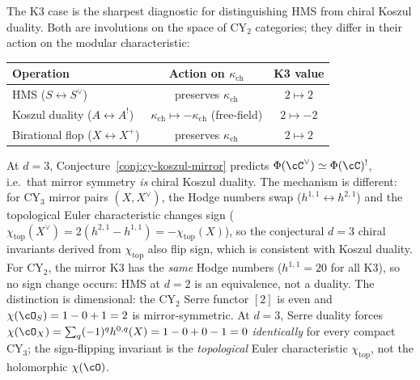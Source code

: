 \begin{remark}[HMS \texorpdfstring{$\neq$}{!=} Koszul: the K3 diagnostic]
\label{rem:hms-neq-koszul-k3}
The K3 case is the sharpest diagnostic for distinguishing HMS from chiral Koszul duality. Both are involutions on the space of CY$_2$ categories; they differ in their action on the modular characteristic:
\begin{center}
\renewcommand{\arraystretch}{1.2}
\begin{tabular}{lcc}
 \toprule
 \textbf{Operation} & \textbf{Action on $\kappa_{\mathrm{ch}}$} & \textbf{K3 value} \\
 \midrule
 HMS ($S \leftrightarrow S^\vee$) & preserves $\kappa_{\mathrm{ch}}$ & $2 \mapsto 2$ \\
 Koszul duality ($A \leftrightarrow A^!$) & $\kappa_{\mathrm{ch}} \mapsto -\kappa_{\mathrm{ch}}$ (free-field) & $2 \mapsto -2$ \\
 Birational flop ($X \leftrightarrow X^+$) & preserves $\kappa_{\mathrm{ch}}$ & $2 \mapsto 2$ \\
 \bottomrule
\end{tabular}
\end{center}
At $d = 3$, Conjecture~\ref{conj:cy-koszul-mirror} predicts $\Phi(\cC^\vee) \simeq \Phi(\cC)^!$, i.e.\ that mirror symmetry \emph{is} chiral Koszul duality. The mechanism is different: for CY$_3$ mirror pairs $(X, X^\vee)$, the Hodge numbers swap ($h^{1,1} \leftrightarrow h^{2,1}$) and the topological Euler characteristic changes sign ($\chi_{\mathrm{top}}(X^\vee) = 2(h^{2,1} - h^{1,1}) = -\chi_{\mathrm{top}}(X)$), so the conjectural $d = 3$ chiral invariants derived from $\chi_{\mathrm{top}}$ also flip sign, which is consistent with Koszul duality. For CY$_2$, the mirror K3 has the \emph{same} Hodge numbers ($h^{1,1} = 20$ for all K3), so no sign change occurs: HMS at $d = 2$ is an equivalence, not a duality. The distinction is dimensional: the CY$_2$ Serre functor $[2]$ is even and $\chi(\cO_S) = 1 - 0 + 1 = 2$ is mirror-symmetric. At $d = 3$, Serre duality forces $\chi(\cO_X) = \sum_q (-1)^q h^{0,q}(X) = 1 - 0 + 0 - 1 = 0$ \emph{identically} for every compact CY$_3$; the sign-flipping invariant is the \emph{topological} Euler characteristic $\chi_{\mathrm{top}}$, not the holomorphic $\chi(\cO)$.
\end{remark}

